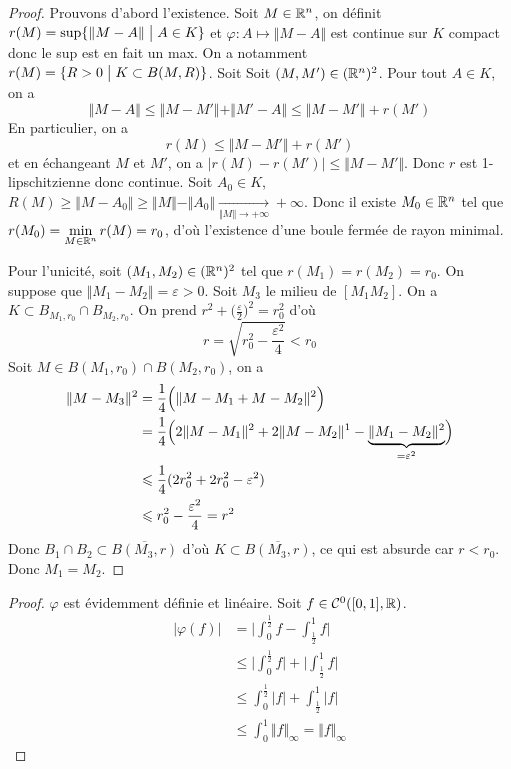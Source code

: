 \begin{proof}
	Prouvons d'abord l'existence. Soit $M\in\mathbb{R}^{n}$, on définit $r(M)=\sup\{\Vert M-A\Vert\bigm| A\in K\}$ et $\varphi\colon A\mapsto\Vert M-A\Vert$ est continue sur $K$ compact donc le sup est en fait un max. On a notamment $r(M)=\{R>0\bigm| K\subset B(M,R)\}$. Soit 
	Soit $(M,M')\in(\mathbb{R}^{n})^{2}$. Pour tout $A\in K$, on a 
	\begin{equation}\Vert M-A\Vert\leqslant\Vert M-M'\Vert+\Vert M'-A\Vert\leqslant\Vert M-M'\Vert +r(M')\end{equation}
	En particulier, on a
	\begin{equation}r(M)\leqslant\Vert M-M'\Vert+r(M')\end{equation}
	et en échangeant $M$ et $M'$, on a $\vert r(M)-r(M')\vert\leqslant\Vert M-M'\Vert$. Donc $r$ est 1-lipschitzienne donc continue. Soit $A_{0}\in K$, $R(M)\geqslant\Vert M-A_{0}\Vert\geqslant\Vert M\Vert-\Vert A_{0}\Vert\xrightarrow[\Vert M\Vert\to+\infty]{}+\infty$. Donc il existe $M_{0}\in\mathbb{R}^{n}$ tel que $r(M_{0})=\min\limits_{M\in\mathbb{R}^{n}}r(M)=r_{0}$, d'où l'existence d'une boule fermée de rayon minimal.

	Pour l'unicité, soit $(M_{1},M_{2})\in(\mathbb{R}^{n})^{2}$ tel que $r(M_{1})=r(M_{2})=r_{0}$. On suppose que $\Vert M_{1}-M_{2}\Vert=\varepsilon>0$. Soit $M_{3}$ le milieu de $[M_{1}M_{2}]$. On a $K\subset B_{M_{1},r_{0}}\cap B_{M_{2},r_{0}}$. On prend $r^{2}+\bigl(\frac{\varepsilon}{2}\bigr)^{2}=r_{0}^{2}$ d'où 
	\begin{equation}r=\sqrt{r_{0}^{2}-\frac{\varepsilon^{2}}{4}}<r_{0}\end{equation}
	Soit $M\in B(M_{1},r_{0})\cap B(M_{2},r_{0})$, on a 
	\begin{align}
		\Vert M-M_{3}\Vert^{2}
		&=\frac{1}{4}\Bigl(\Vert M-M_{1}+M-M_{2}\Vert^{2}\Bigr)\\
		&=\frac{1}{4}\Bigl(2\Vert M-M_{1}\Vert^{2}+2\Vert M-M_{2}\Vert^{1}-\underbrace{\Vert M_{1}-M_{2}\Vert^{2}}_{=\varepsilon^{2}}\Bigr)\\
		&\leqslant\frac{1}{4}(2r_{0}^{2}+2r_{0}^{2}-\varepsilon^{2})\\
		&\leqslant r_{0}^{2}-\frac{\varepsilon^{2}}{4}=r^{2}
	\end{align}
	Donc $B_{1}\cap B_{2}\subset\overline{B(M_{3},r)}$ d'où $K\subset\overline{B(M_{3},r)}$, ce qui est absurde car $r<r_{0}$. Donc $M_{1}=M_{2}$.
\end{proof}

\begin{proof}
	$\varphi$ est évidemment définie et linéaire. Soit $f\in\mathcal{C}^{0}([0,1],\mathbb{R})$.
	\begin{align}
		\vert\varphi(f)\vert
		&=\Biggl\vert\int_{0}^{\frac{1}{2}}f-\int_{\frac{1}{2}}^{1}f\Biggr\vert\\
		&\leqslant\Biggl\vert\int_{0}^{\frac{1}{2}}f\Biggr\vert+\Biggl\vert\int_{\frac{1}{2}}^{1}f\Biggr\vert\\
		&\leqslant\int_{0}^{\frac{1}{2}}\vert f\vert+\int_{\frac{1}{2}}^{1}\vert f\vert\\
		&\leqslant\int_{0}^{1}\Vert f\Vert_{\infty}=\Vert f\Vert_{\infty}
	\end{align}
\end{proof}

